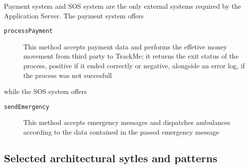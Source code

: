 \documentclass[../DD0.tex]{subfiles}
\begin{document}
      Payment system and SOS system are the only external systems required by the Application Server. The payment system offers
      \begin{description}
        \item[\texttt{processPayment}] This method accepts payment data and performs the effetive money movement from third party to TrackMe; it returns the exit status of the process, positive if it ended correctly or negative, alongside an error log, if the process was not succesfull
      \end{description}
      while the SOS system offers
      \begin{description}
        \item[\texttt{sendEmergency}] This method accepts emergency messages and dispatches ambulances according to the data contained in the passed emergency message
      \end{description}

  \subsection{Selected architectural sytles and patterns}
  \label{sec:stylesandpatterns}
\end{document}
